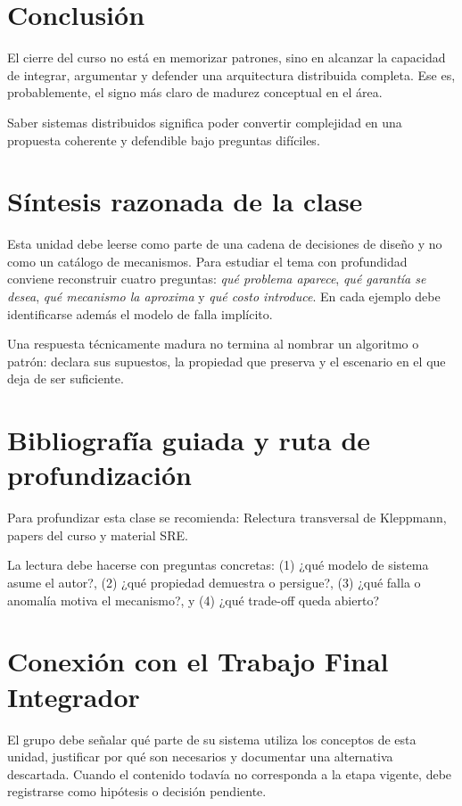 \documentclass[variant=apuntes,cover=institutional,mode=screen]{ua-engineering-v6-article}
\begin{document}
\section{Conclusión}

El cierre del curso no está en memorizar patrones, sino en alcanzar la capacidad de integrar, argumentar y defender una arquitectura distribuida completa. Ese es, probablemente, el signo más claro de madurez conceptual en el área.

\begin{uakeybox}
Saber sistemas distribuidos significa poder convertir complejidad en una propuesta coherente y defendible bajo preguntas difíciles.
\end{uakeybox}


\section{Síntesis razonada de la clase}
Esta unidad debe leerse como parte de una cadena de decisiones de diseño y no como un catálogo de mecanismos. Para estudiar el tema con profundidad conviene reconstruir cuatro preguntas: \emph{qué problema aparece}, \emph{qué garantía se desea}, \emph{qué mecanismo la aproxima} y \emph{qué costo introduce}. En cada ejemplo debe identificarse además el modelo de falla implícito.

\begin{uakeybox}
Una respuesta técnicamente madura no termina al nombrar un algoritmo o patrón: declara sus supuestos, la propiedad que preserva y el escenario en el que deja de ser suficiente.
\end{uakeybox}

\section{Bibliografía guiada y ruta de profundización}
Para profundizar esta clase se recomienda: Relectura transversal de Kleppmann, papers del curso y material SRE.

La lectura debe hacerse con preguntas concretas: (1) ¿qué modelo de sistema asume el autor?, (2) ¿qué propiedad demuestra o persigue?, (3) ¿qué falla o anomalía motiva el mecanismo?, y (4) ¿qué trade-off queda abierto?

\section{Conexión con el Trabajo Final Integrador}
El grupo debe señalar qué parte de su sistema utiliza los conceptos de esta unidad, justificar por qué son necesarios y documentar una alternativa descartada. Cuando el contenido todavía no corresponda a la etapa vigente, debe registrarse como hipótesis o decisión pendiente.
\end{document}
